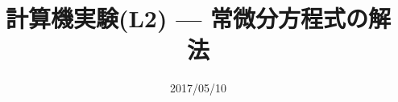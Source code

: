 \documentclass[dvipdfmx]{beamer}
\title{計算機実験(L2) --- 常微分方程式の解法}
\date{2017/05/10}
\begin{document}
\begin{frame}
  \titlepage
  \tableofcontents
\end{frame}






\end{document}
